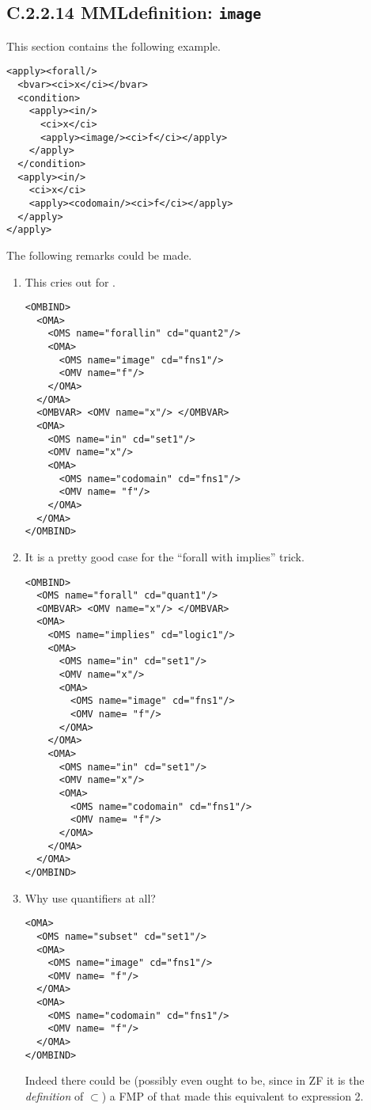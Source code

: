 \documentclass{llncs}
\begin{document}
{\subsection{C.2.2.14 MMLdefinition: {\tt image}\label{C2214}}
This section contains the following example.
\begin{lstlisting}[language=MathML2]
<apply><forall/>
  <bvar><ci>x</ci></bvar>
  <condition>
    <apply><in/>
      <ci>x</ci>
      <apply><image/><ci>f</ci></apply>
    </apply>
  </condition>
  <apply><in/>
    <ci>x</ci>
    <apply><codomain/><ci>f</ci></apply>
  </apply>
</apply>
\end{lstlisting}
The following remarks could be made.
\begin{enumerate}
\item This cries out for {}.
\begin{lstlisting}
<OMBIND>
  <OMA>
    <OMS name="forallin" cd="quant2"/>
    <OMA>
      <OMS name="image" cd="fns1"/>
      <OMV name="f"/>
    </OMA>
  </OMA>
  <OMBVAR> <OMV name="x"/> </OMBVAR>
  <OMA>
    <OMS name="in" cd="set1"/>
    <OMV name="x"/> 
    <OMA>
      <OMS name="codomain" cd="fns1"/>
      <OMV name= "f"/>
    </OMA>
  </OMA>
</OMBIND>
\end{lstlisting}
\item It is a pretty good case for the ``forall with implies'' trick.
\begin{lstlisting}
<OMBIND>
  <OMS name="forall" cd="quant1"/>
  <OMBVAR> <OMV name="x"/> </OMBVAR>
  <OMA>
    <OMS name="implies" cd="logic1"/>
    <OMA>
      <OMS name="in" cd="set1"/>
      <OMV name="x"/> 
      <OMA>
        <OMS name="image" cd="fns1"/>
        <OMV name= "f"/>
      </OMA>
    </OMA>
    <OMA>
      <OMS name="in" cd="set1"/>
      <OMV name="x"/> 
      <OMA>
        <OMS name="codomain" cd="fns1"/>
        <OMV name= "f"/>
      </OMA>
    </OMA>
  </OMA>
</OMBIND>
\end{lstlisting}
\item Why use quantifiers at all?
\begin{lstlisting}
<OMA>
  <OMS name="subset" cd="set1"/>
  <OMA>
    <OMS name="image" cd="fns1"/>
    <OMV name= "f"/>
  </OMA>
  <OMA>
    <OMS name="codomain" cd="fns1"/>
    <OMV name= "f"/>
  </OMA>
</OMBIND>
\end{lstlisting}
Indeed there could be (possibly even ought to be, since in ZF it is the
{\it definition\/} of $\subset$) a FMP of {} that made this
equivalent to expression 2.
\end{enumerate}
}
\end{document}

